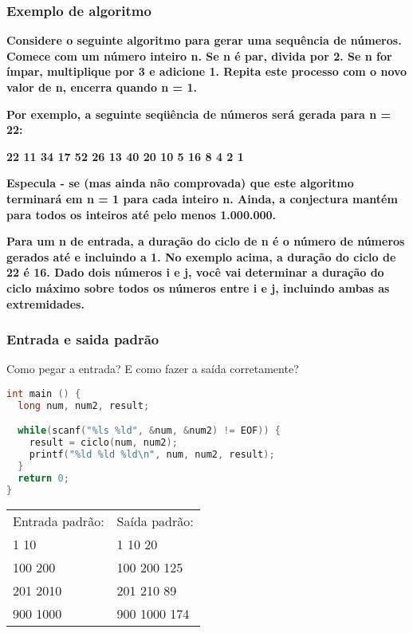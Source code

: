 \begin{frame}
  \frametitle{Exemplo de algoritmo}
  \textbf{\footnotesize Considere o seguinte algoritmo para gerar uma sequência de números. Comece com um número inteiro n. Se n é par, divida por 2. Se n for ímpar, multiplique por 3 e adicione 1. Repita este processo com o novo valor de n, encerra quando n = 1.}
  
  \textbf{\footnotesize Por exemplo, a seguinte seqüência de números será gerada para n = 22:}
  
  \textbf{\footnotesize 22 11 34 17 52 26 13 40 20 10 5 16 8 4 2 1}
  
  \textbf{\footnotesize Especula - se (mas ainda não comprovada) que este algoritmo terminará em n = 1 para cada inteiro n. Ainda, a conjectura mantém para todos os inteiros até pelo menos 1.000.000.}
  
  \textbf{\footnotesize Para um n de entrada, a duração do ciclo de n é o número de números gerados até e incluindo a 1. No exemplo acima, a duração do ciclo de 22 é 16. Dado dois números i e j, você vai determinar a duração do ciclo máximo sobre todos os números entre i e j, incluindo ambas as extremidades.}
\end{frame}

\begin{frame}[fragile]
  \frametitle{Entrada e saida padrão}
  Como pegar a entrada? E como fazer a saída corretamente?
  \begin{lstlisting}[language=c]
int main () {
  long num, num2, result;

  while(scanf("%ls %ld", &num, &num2) != EOF)) {
    result = ciclo(num, num2);
    printf("%ld %ld %ld\n", num, num2, result); 
  }
  return 0;
}
  \end{lstlisting}
  \begin{tabular}{ll}\\
    Entrada padrão: &Saída padrão:\\
    1 10 &1 10 20\\
    100 200 &100 200 125\\
    201 2010 &201 210 89\\
    900 1000 &900 1000 174\\	
  \end{tabular}
\end{frame}

